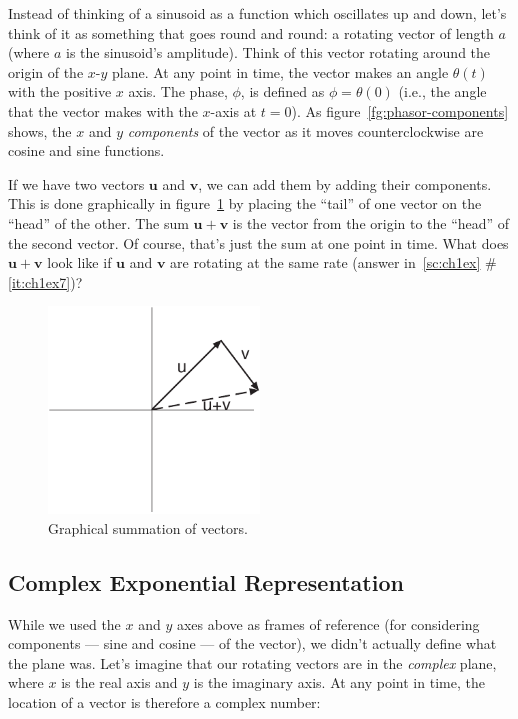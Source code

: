 Instead of thinking of a sinusoid as a function which oscillates up
and down, let's think of it as something that goes round and round: a
rotating vector of length $a$ (where $a$ is the sinusoid's
amplitude). Think of this vector rotating around the origin of the
$x$-$y$ plane.  At any point in time, the vector makes an angle
$\theta(t)$ with the positive $x$ axis. The phase, $\phi$, is defined
as $\phi = \theta(0)$ (i.e., the angle that the vector makes with the
$x$-axis at $t=0$).  As figure~\ref{fg:phasor-components} shows, the
$x$ and $y$ \emph{components} of the vector as it moves
counterclockwise are cosine and sine functions.

If we have two vectors $\mathbf{u}$ and $\mathbf{v}$, we can add them
by adding their components.  This is done graphically in
figure~\ref{fg:vector-sum} by placing the ``tail'' of one vector on
the ``head'' of the other. The sum $\mathbf{u}+\mathbf{v}$ is the
vector from the origin to the ``head'' of the second vector. Of
course, that's just the sum at one point in time. What does
$\mathbf{u}+\mathbf{v}$ look like if $\mathbf{u}$ and $\mathbf{v}$ are
rotating at the same rate (answer in~\ref{sc:ch1ex} \#\ref{it:ch1ex7})?

\begin{figure}
\centerline{\includegraphics[width=0.5\textwidth]{ch-physical/vector-sum}}
\caption{Graphical summation of vectors.\label{fg:vector-sum}}
\end{figure}

\subsection*{Complex Exponential Representation}

While we used the $x$ and $y$ axes above as frames of reference (for
considering components --- sine and cosine --- of the vector), we
didn't actually define what the plane was. Let's imagine that our
rotating vectors are in the \emph{complex} plane, where $x$ is the
real axis and $y$ is the imaginary axis.  At any point in time, the
location of a vector is therefore a complex number: 

